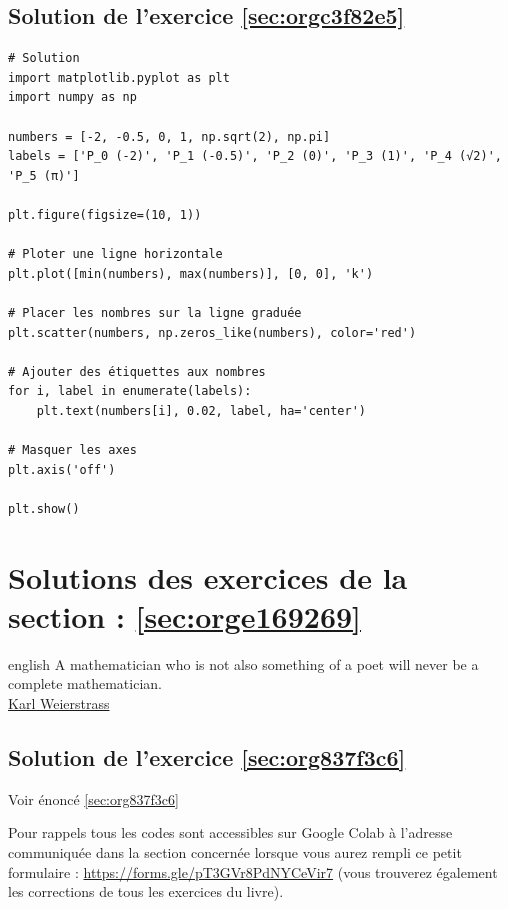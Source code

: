 \documentclass[a4paper, 11pt, twoside]{book}
\begin{document}
\section{Solution de l'exercice \ref{sec:orgc3f82e5}}
\label{sec:orgefbdf8f}
\begin{verbatim}
# Solution
import matplotlib.pyplot as plt
import numpy as np

numbers = [-2, -0.5, 0, 1, np.sqrt(2), np.pi]
labels = ['P_0 (-2)', 'P_1 (-0.5)', 'P_2 (0)', 'P_3 (1)', 'P_4 (√2)', 'P_5 (π)']

plt.figure(figsize=(10, 1))

# Ploter une ligne horizontale
plt.plot([min(numbers), max(numbers)], [0, 0], 'k')

# Placer les nombres sur la ligne graduée
plt.scatter(numbers, np.zeros_like(numbers), color='red')

# Ajouter des étiquettes aux nombres
for i, label in enumerate(labels):
    plt.text(numbers[i], 0.02, label, ha='center')

# Masquer les axes
plt.axis('off')

plt.show()
\end{verbatim}
\stopcontents[level-2]

\chapter{Solutions des exercices de la section : \ref{sec:orge169269}}
\label{sec:orgccc811d}
\startcontents[level-2]

\begin{foreigndisplayquote}{english}
A mathematician who is not also something of a poet will never be a
complete mathematician.\\

\href{https://en.wikipedia.org/wiki/Karl\_Weierstrass}{Karl Weierstrass}
\end{foreigndisplayquote}

\section{Solution de l'exercice \ref{sec:org837f3c6}}
\label{sec:org814b848}
Voir énoncé \ref{sec:org837f3c6}

Pour rappels tous les codes sont accessibles sur Google Colab à
l'adresse communiquée dans la section concernée lorsque vous
aurez rempli ce petit formulaire :
\url{https://forms.gle/pT3GVr8PdNYCeVir7} (vous trouverez également
les corrections de tous les exercices du livre).
\end{document}
